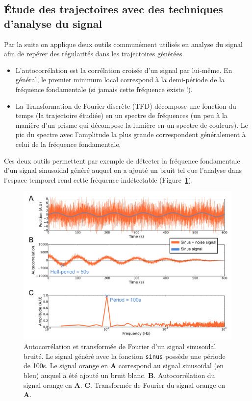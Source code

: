 \documentclass[12pt,a4paper,twoside,openright]{book}
\begin{document}
\subsection{Étude des trajectoires avec des techniques d'analyse du
signal}\label{uxe9tude-des-trajectoires-avec-des-techniques-danalyse-du-signal}

Par la suite on applique deux outils communément utilisés en analyse du
signal afin de repérer des régularités dans les trajectoires générées.

\begin{itemize}
\item
  L'autocorrélation est la corrélation croisée d'un signal par lui-même.
  En général, le premier minimum local correspond à la demi-période de
  la fréquence fondamentale (si jamais cette fréquence existe !).
\item
  La Transformation de Fourier discrète (TFD) décompose une fonction du
  temps (la trajectoire étudiée) en un spectre de fréquences (un peu à
  la manière d'un prisme qui décompose la lumière en un spectre de
  couleurs). Le pic du spectre avec l'amplitude la plus grande
  correspondent généralement à celui de la fréquence fondamentale.
\end{itemize}

Ces deux outils permettent par exemple de détecter la fréquence
fondamentale d'un signal sinusoidal généré auquel on a ajouté un bruit
tel que l'analyse dans l'espace temporel rend cette fréquence
indétectable (Figure~\ref{fig:simu-oscill-sinus}).

\begin{figure}[htbp]
\centering
\includegraphics{figures/annexes/simu_oscill_sinus.png}
\caption[Autocorrélation et transformée de Fourier d'un signal sinusoïdal bruité]{\label{fig:simu-oscill-sinus}Autocorrélation
et transformée de Fourier d'un signal sinusoïdal bruité. Le signal
généré avec la fonction \texttt{sinus} possède une période de 100s. Le
signal orange en \textbf{A} correspond au signal sinusoïdal (en bleu)
auquel a été ajouté un bruit blanc. \textbf{B}. Autocorrélation du
signal orange en \textbf{A}. \textbf{C}. Transformée de Fourier du
signal orange en \textbf{A}.}
\end{figure}
\end{document}
